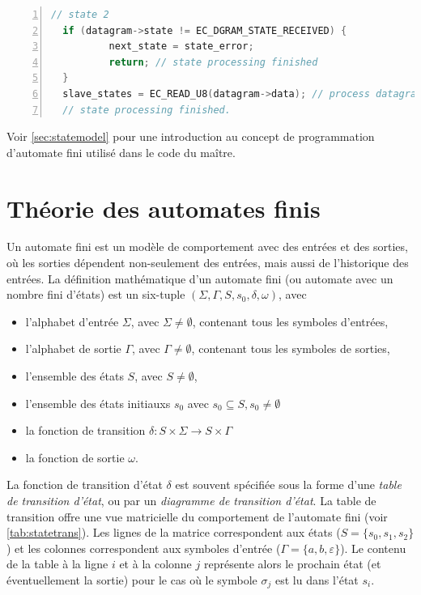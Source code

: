 \documentclass[a4paper,12pt,BCOR6mm,bibtotoc,idxtotoc]{scrbook}
\begin{document}
\begin{lstlisting}[gobble=2,language=C,numbers=left]
  // state 2
  if (datagram->state != EC_DGRAM_STATE_RECEIVED) {
          next_state = state_error;
          return; // state processing finished
  }
  slave_states = EC_READ_U8(datagram->data); // process datagram
  // state processing finished.
\end{lstlisting}

Voir \autoref{sec:statemodel} pour une introduction au concept de
programmation d'automate fini utilis\'e dans le code du ma\^itre.


\section{Th\'eorie des automates finis}
\label{sec:fsmtheory}

Un automate fini \cite{automata} est un mod\`ele de comportement avec
des entr\'ees et des sorties, o\`u les sorties d\'ependent non-seulement des
entr\'ees, mais aussi de l'historique des entr\'ees.  La d\'efinition
math\'ematique d'un automate fini (ou automate avec un nombre fini
d'\'etats) est un six-tuple $(\Sigma, \Gamma, S, s_0, \delta, \omega)$,
avec

\begin{itemize}
\item l'alphabet d'entr\'ee $\Sigma$, avec $\Sigma \neq
  \emptyset$, contenant tous les symboles d'entr\'ees,
\item l'alphabet de sortie $\Gamma$, avec $\Gamma \neq
  \emptyset$, contenant tous les symboles de sorties,
\item l'ensemble des \'etats $S$, avec $S \neq \emptyset$,
\item l'ensemble des \'etats initiauxs $s_0$ avec
  $s_0 \subseteq S, s_0 \neq \emptyset$
\item la fonction de transition
  $\delta: S \times \Sigma \rightarrow S \times \Gamma$
\item la fonction de sortie $\omega$.
\end{itemize}

La fonction de transition d'\'etat $\delta$ est souvent sp\'ecifi\'ee
sous la forme d'une \textit{table de transition d'\'etat}, ou par un
\textit{diagramme de transition d'\'etat}.  La table de transition
offre une vue matricielle du comportement de l'automate fini (voir
\autoref{tab:statetrans}).  Les lignes de la matrice correspondent aux
\'etats ($S = \{s_0, s_1, s_2\}$) et les colonnes correspondent aux
symboles d'entr\'ee ($\Gamma = \{a, b, \varepsilon\}$).  Le contenu de
la table \`a la ligne $i$ et \`a la colonne $j$ repr\'esente alors le
prochain \'etat (et \'eventuellement la sortie) pour le cas o\`u le
symbole $\sigma_j$ est lu dans l'\'etat $s_i$.
\end{document}
